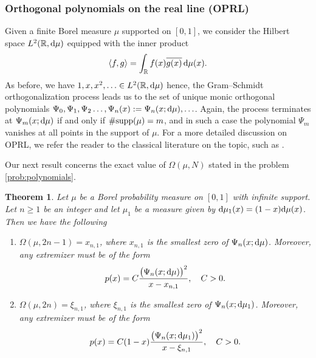 \documentclass[reqno, a4paper]{amsart}
\def\R{\mathbb{R}}
\def\supp{{\rm supp}}
\renewcommand{\d}{\text{\rm d}}
\theoremstyle{plain}
\newtheorem{theorem}{Theorem}
\theoremstyle{definition}
\theoremstyle{remarkstyle}
\numberwithin{equation}{section}
\begin{document}
\subsubsection{Orthogonal polynomials on the real line (OPRL)} Given a finite Borel measure $\mu$ supported on $[0, 1]$, we consider the Hilbert space $L^2(\R, \d\mu)$ equipped with the inner product 
\begin{equation*}
    \langle f, g\rangle= \int_{\R} f(x)\overline{g(x)}\,\d\mu(x).
\end{equation*}
As before, we have $1, x, x^2, \ldots \in L^2(\R, \d\mu)$ hence, the Gram--Schmidt orthogonalization process leads us to the set of unique monic orthogonal polynomials $\Psi_0, \Psi_1, \Psi_2 \ldots, \Psi_n(x):=\Psi_n(x;\d\mu), \ldots $. Again, the process terminates at $\Psi_m(x;\d\mu)$ if and only if $\#\supp(\mu)=m$, and in such a case the polynomial $\Psi_m$ vanishes at all points in the support of $\mu$. For a more detailed discussion on OPRL, we refer the reader to the classical literature on the topic, such as \cite{Ismail2005ClassicalAndQuantum, SzegoOrthogonalPolynomials1939}.

Our next result concerns the exact value of $\Omega(\mu, N)$ stated in the problem \ref{prob:polynomials}. 

\begin{theorem}\label{thm:sign uncertainty for polynomials}    
    Let $\mu$ be a Borel probability measure on $[0, 1]$ with infinite support. Let $n\geq 1$ be an integer and let $\mu_1$ be a measure given by $\d\mu_1(x)=(1-x)\d\mu(x)$. Then we have the following 
    \begin{enumerate}[label=\upshape(\roman*)]
        \item $\Omega(\mu, 2n-1)=x_{n, 1}$, where $x_{n,1}$ is the smallest zero of $\Psi_{n}(x; \d\mu)$. Moreover, any extremizer must be of the form  
        \begin{equation*}
            p(x)=C\frac{\bigl(\Psi_n(x;\d\mu)\bigr)^2}{x-x_{n,1}}, \quad C>0.
        \end{equation*}
        \item $\Omega(\mu, 2n)=\xi_{n, 1}$, where $\xi_{n,1}$ is the smallest zero of $\Psi_{n}(x; \d\mu_1)$. Moreover, any extremizer must be of the form  
        \begin{equation*}
            p(x)=C(1-x)\frac{\bigl(\Psi_{n}(x; \d\mu_1)\bigr)^2}{x-\xi_{n,1}}, \quad C>0.
        \end{equation*}
    \end{enumerate}
\end{theorem}
\end{document}
